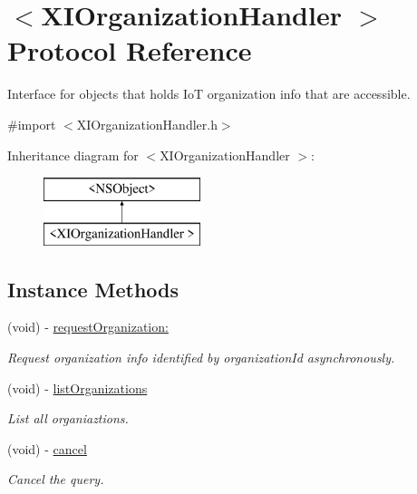 \hypertarget{protocol_x_i_organization_handler_01-p}{}\section{$<$X\+I\+Organization\+Handler $>$ Protocol Reference}
\label{protocol_x_i_organization_handler_01-p}


Interface for objects that holds IoT organization info that are accessible.  




{\ttfamily \#import $<$X\+I\+Organization\+Handler.\+h$>$}

Inheritance diagram for $<$X\+I\+Organization\+Handler $>$\+:\begin{figure}[H]
\begin{center}
\leavevmode
\includegraphics[height=2.000000cm]{protocol_x_i_organization_handler_01-p}
\end{center}
\end{figure}
\subsection*{Instance Methods}
\begin{DoxyCompactItemize}
\item 
(void) -\/ \hyperlink{protocol_x_i_organization_handler_01-p_a36711047f2e239abe173fbc750d25569}{request\+Organization\+:}
\begin{DoxyCompactList}\small\item\em Request organization info identified by organization\+Id asynchronously. \end{DoxyCompactList}\item 
(void) -\/ \hyperlink{protocol_x_i_organization_handler_01-p_afb5982385b4013f40f7c996c32311816}{list\+Organizations}
\begin{DoxyCompactList}\small\item\em List all organiaztions. \end{DoxyCompactList}\item 
(void) -\/ \hyperlink{protocol_x_i_organization_handler_01-p_af3b06f8c5b80ad208741cee353356fbc}{cancel}
\begin{DoxyCompactList}\small\item\em Cancel the query. \end{DoxyCompactList}\end{DoxyCompactItemize}

